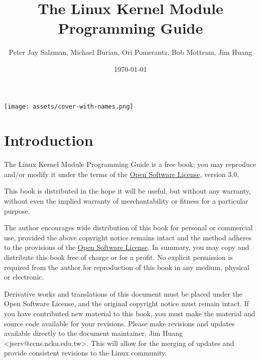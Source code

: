 \documentclass[10pt, oneside]{book}
\author{Peter Jay Salzman, Michael Burian, Ori Pomerantz, Bob Mottram, Jim Huang}
\date{\today}
\title{The Linux Kernel Module Programming Guide}
\begin{document}
\maketitle
\ifdefined\HCode
\texttt{[image: assets/cover-with-names.png]}
\else
\pagestyle{empty}
\tableofcontents
\fi

\section{Introduction}
\label{sec:introduction}
The Linux Kernel Module Programming Guide is a free book; you may reproduce and/or modify it under the terms of the \href{https://opensource.org/licenses/OSL-3.0}{Open Software License}, version 3.0.

This book is distributed in the hope it will be useful, but without any warranty, without even the implied warranty of merchantability or fitness for a particular purpose.

The author encourages wide distribution of this book for personal or commercial use, provided the above copyright notice remains intact and the method adheres to the provisions of the \href{https://opensource.org/licenses/OSL-3.0}{Open Software License}.
In summary, you may copy and distribute this book free of charge or for a profit. No explicit permission is required from the author for reproduction of this book in any medium, physical or electronic.

Derivative works and translations of this document must be placed under the Open Software License, and the original copyright notice must remain intact.
If you have contributed new material to this book, you must make the material and source code available for your revisions.
Please make revisions and updates available directly to the document maintainer, Jim Huang <jserv@ccns.ncku.edu.tw>.
This will allow for the merging of updates and provide consistent revisions to the Linux community.
\end{document}
